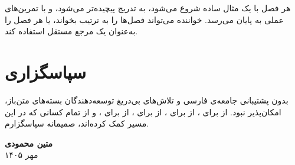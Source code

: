 هر فصل با یک مثال ساده شروع می‌شود، به تدریج پیچیده‌تر
می‌شود، و با تمرین‌های عملی به پایان می‌رسد. خواننده
می‌تواند فصل‌ها را به ترتیب بخواند، یا هر فصل را
به‌عنوان یک مرجع مستقل استفاده کند.

\section*{سپاسگزاری}

 بدون پشتیبانی جامعه‌ی  فارسی
و تلاش‌های بی‌دریغ توسعه‌دهندگان بسته‌های متن‌باز،
امکان‌پذیر نبود. از  برای
، از  برای
، از  برای
، از  برای
، و از تمام کسانی که در این مسیر
کمک کرده‌اند، صمیمانه سپاسگزارم.

\vspace{1cm}

\begin{flushleft}
    \textbf{متین محمودی} \\
    مهر ۱۴۰۵
\end{flushleft}

\clearpage